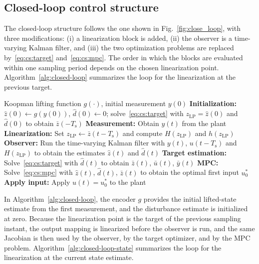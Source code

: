 \documentclass[preprint,12pt,authoryear]{elsarticle}
\theoremstyle{remark}
\newcommand{\ui}[2]{#1_{\text{#2}}}
\begin{document}
\subsection{Closed-loop control structure}
\label{sec:method:cl}

The closed-loop structure follows the one shown in Fig.~\ref{fig:close_loop}, with three modifications: (i) a linearization block is added, (ii) the observer is a time-varying Kalman filter, and (iii) the two optimization problems are replaced by~\eqref{eq:cs:target} and~\eqref{eq:cs:mpc}. The order in which the blocks are evaluated within one sampling period depends on the chosen linearization point. Algorithm~\ref{alg:closed-loop} summarizes the loop for the linearization at the previous target.
\begin{algorithm}[H]
  \caption{Closed-loop control with nonlinear output mapping and linearization at the previous target}
  \label{alg:closed-loop}
  \begin{algorithmic}[1]
    \REQUIRE Koopman lifting function $g(\cdot)$, initial measurement $y(0)$
    \STATE \textbf{Initialization:} $\hat{z}(0) \leftarrow g(y(0))$, $\hat{d}(0) \leftarrow 0$; solve~\eqref{eq:cs:target} with $\ui{z}{LP} = \hat{z}(0)$ and $\hat{d}(0)$ to obtain $\bar{z}(-T_\text{s})$
    \LOOP
      \STATE \textbf{Measurement:} Obtain $y(t)$ from the plant
      \STATE \textbf{Linearization:} Set $\ui{z}{LP} \leftarrow \bar{z}(t-T_\text{s})$ and compute $H(\ui{z}{LP})$ and $h(\ui{z}{LP})$
      \STATE \textbf{Observer:} Run the time-varying Kalman filter with $y(t)$, $u(t-T_\text{s})$ and $H(\ui{z}{LP})$ to obtain the estimates $\hat{z}(t)$ and $\hat{d}(t)$
      \STATE \textbf{Target estimation:} Solve~\eqref{eq:cs:target} with $\hat{d}(t)$ to obtain $\bar{z}(t)$, $\bar{u}(t)$, $\bar{y}(t)$
      \STATE \textbf{MPC:} Solve~\eqref{eq:cs:mpc} with $\hat{z}(t)$, $\hat{d}(t)$, $\bar{z}(t)$ to obtain the optimal first input $u_0^*$
      \STATE \textbf{Apply input:} Apply $u(t) = u_0^*$ to the plant
    \ENDLOOP
  \end{algorithmic}
\end{algorithm}
In Algorithm~\ref{alg:closed-loop}, the encoder $g$ provides the initial lifted-state estimate from the first measurement, and the disturbance estimate is initialized at zero. Because the linearization point is the target of the previous sampling instant, the output mapping is linearized before the observer is run, and the same Jacobian is then used by the observer, by the target optimizer, and by the MPC problem. Algorithm~\ref{alg:closed-loop-state} summarizes the loop for the linearization at the current state estimate.
\end{document}
